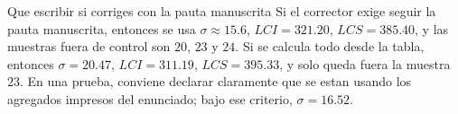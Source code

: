 \begin{trampa}{Que escribir si corriges con la pauta manuscrita}
Si el corrector exige seguir la pauta manuscrita, entonces se usa \(\sigma\approx 15.6\), \(LCI=321.20\), \(LCS=385.40\), y las muestras fuera de control son \(20\), \(23\) y \(24\). Si se calcula todo desde la tabla, entonces \(\sigma=20.47\), \(LCI=311.19\), \(LCS=395.33\), y solo queda fuera la muestra \(23\). En una prueba, conviene declarar claramente que se estan usando los agregados impresos del enunciado; bajo ese criterio, \(\sigma=16.52\).
\end{trampa}
